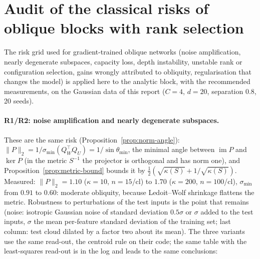 \documentclass[11pt,a4paper]{article}
\theoremstyle{plain}
\theoremstyle{definition}
\theoremstyle{remark}
\newcommand{\im}{\operatorname{im}}
\newcommand{\T}{\top}
\begin{document}
\section{Audit of the classical risks of oblique blocks with rank selection}
\label{sec:audit}
The risk grid used for gradient-trained oblique networks (noise
amplification, nearly degenerate subspaces, capacity loss, depth
instability, unstable rank or configuration selection, gains wrongly
attributed to obliquity, regularisation that changes the model) is applied
here to the analytic block, with the recommended measurements, on the
Gaussian data of this
report ($C=4$, $d=20$, separation $0.8$, 20 seeds).

\paragraph{R1/R2: noise amplification and nearly degenerate subspaces.}
These are the same risk (Proposition~\ref{prop:norm-angle}):
$\|P\|_2=1/\sigma_{\min}(Q_W^\T Q_U)=1/\sin\theta_{\min}$, the minimal angle
between $\im P$ and $\ker P$ (in the metric $S^{-1}$ the projector is
orthogonal and has norm one), and Proposition~\ref{prop:metric-bound} bounds it
by $\tfrac12(\sqrt{\kappa(S)}+1/\sqrt{\kappa(S)})$. Measured: $\|P\|_2=1.10$
($\kappa=10$, $n=15$/cl) to $1.70$ ($\kappa=200$, $n=100$/cl), $\sigma_{\min}$
from $0.91$ to $0.60$: moderate obliquity, because Ledoit--Wolf shrinkage
flattens the metric. Robustness to perturbations of the test inputs is the
point that remains (noise: isotropic Gaussian noise of standard deviation
$0.5\sigma$ or $\sigma$ added to the test inputs, $\sigma$ the mean
per-feature standard deviation of the training set; last column: test cloud
dilated by a factor two about its mean). The three variants use the same
read-out, the centroid rule on their code; the same table with the
least-squares read-out is in the log and leads to the same conclusions:
\begin{center}
\footnotesize
\setlength{\tabcolsep}{3pt}
\end{center}
\end{document}
